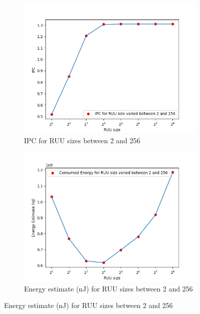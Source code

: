 \documentclass[11pt]{article}
\begin{document}
\vspace{-1em}
\begin{figure}[H]
  \centering
  \begin{subfigure}{.5\textwidth}
    \centering
    \includegraphics[width=1.0\textwidth]{"../plots/vary-ruu-ipc.png"}
    \caption{IPC for RUU sizes between 2 and 256}
    \label{fig:sub1}
  \end{subfigure}%
  \begin{subfigure}{.5\textwidth}
    \centering
    \includegraphics[width=1.0\textwidth]{"../plots/vary-ruu-energy.png"}
    \caption{Energy estimate (nJ) for RUU sizes between 2 and 256}
    \label{fig:sub2}
  \end{subfigure}
\end{figure}
\vspace{-1em}
\end{document}
